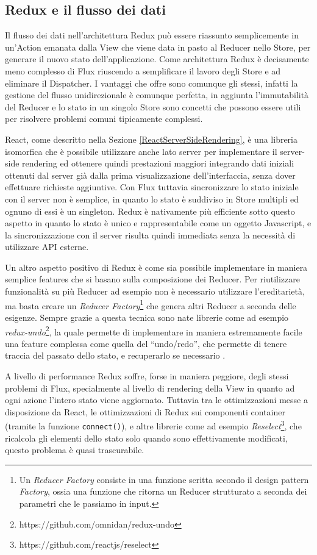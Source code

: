 \subsection{Redux e il flusso dei dati}
Il flusso dei dati nell'architettura Redux può essere riassunto semplicemente in un'Action emanata dalla View che viene data in pasto al Reducer nello Store, per generare il nuovo stato dell'applicazione.
Come architettura Redux è decisamente meno complesso di Flux riuscendo a semplificare il lavoro degli Store e ad eliminare il Dispatcher. I vantaggi che offre sono comunque gli stessi, infatti la gestione del flusso unidirezionale è comunque perfetta, in aggiunta l'immutabilità del Reducer e lo stato in un singolo Store sono concetti che possono essere utili per risolvere problemi comuni tipicamente complessi.

React, come descritto nella Sezione \ref{ReactServerSideRendering}, è una libreria isomorfica che è possibile utilizzare anche lato server per implementare il server-side rendering ed ottenere quindi prestazioni maggiori integrando dati iniziali ottenuti dal server già dalla prima visualizzazione dell'interfaccia, senza dover effettuare richieste aggiuntive. Con Flux tuttavia sincronizzare lo stato iniziale con il server non è semplice, in quanto lo stato è suddiviso in Store multipli ed ognuno di essi è un singleton. Redux è nativamente più efficiente sotto questo aspetto in quanto lo stato è unico e rappresentabile come un oggetto Javascript, e la sincronizzazione con il server risulta quindi immediata senza la necessità di utilizzare API esterne.

Un altro aspetto positivo di Redux è come sia possibile implementare in maniera semplice features che si basano sulla composizione dei Reducer. Per riutilizzare funzionalità su più Reducer ad esempio non è necessario utilizzare l'ereditarietà, ma basta creare un \textit{Reducer Factory}\footnote{Un \textit{Reducer Factory} consiste in una funzione scritta secondo il design pattern \textit{Factory}, ossia una funzione che ritorna un Reducer strutturato a seconda dei parametri che le passiamo in input.} che genera altri Reducer a seconda delle esigenze.
Sempre grazie a questa tecnica sono nate librerie come ad esempio \textit{redux-undo}\footnote{https://github.com/omnidan/redux-undo}, la quale permette di implementare in maniera estremamente facile una feature complessa come quella del “undo/redo”, che permette di tenere traccia del passato dello stato, e recuperarlo se necessario \cite{AbramovOnReduxVsFlux}.

A livello di performance Redux soffre, forse in maniera peggiore, degli stessi problemi di Flux, specialmente al livello di rendering della View in quanto ad ogni azione l'intero stato viene aggiornato. Tuttavia tra le ottimizzazioni messe a disposizione da React, le ottimizzazioni di Redux sui componenti container (tramite la funzione \texttt{connect()}), e altre librerie come ad esempio \textit{Reselect}\footnote{https://github.com/reactjs/reselect}, che ricalcola gli elementi dello stato solo quando sono effettivamente modificati, questo problema è quasi trascurabile.